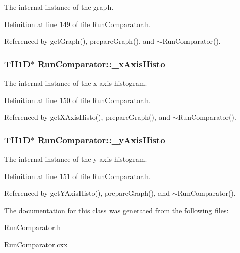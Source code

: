 The internal instance of the graph. 



Definition at line 149 of file Run\-Comparator.\-h.



Referenced by get\-Graph(), prepare\-Graph(), and $\sim$\-Run\-Comparator().

\hypertarget{class_run_comparator_ab86d48424540d0f3f9abf52a2c11366b}{
\subsubsection[{\-\_\-x\-Axis\-Histo}]{\setlength{\rightskip}{0pt plus 5cm}T\-H1\-D$\ast$ Run\-Comparator\-::\-\_\-x\-Axis\-Histo\hspace{0.3cm}{\ttfamily [protected]}}}\label{class_run_comparator_ab86d48424540d0f3f9abf52a2c11366b}


The internal instance of the x axis histogram. 



Definition at line 150 of file Run\-Comparator.\-h.



Referenced by get\-X\-Axis\-Histo(), prepare\-Graph(), and $\sim$\-Run\-Comparator().

\hypertarget{class_run_comparator_a05efdd671ec49502c946eb813e84ed62}{
\subsubsection[{\-\_\-y\-Axis\-Histo}]{\setlength{\rightskip}{0pt plus 5cm}T\-H1\-D$\ast$ Run\-Comparator\-::\-\_\-y\-Axis\-Histo\hspace{0.3cm}{\ttfamily [protected]}}}\label{class_run_comparator_a05efdd671ec49502c946eb813e84ed62}


The internal instance of the y axis histogram. 



Definition at line 151 of file Run\-Comparator.\-h.



Referenced by get\-Y\-Axis\-Histo(), prepare\-Graph(), and $\sim$\-Run\-Comparator().



The documentation for this class was generated from the following files\-:\begin{DoxyCompactItemize}
\item 
\hyperlink{_run_comparator_8h}{Run\-Comparator.\-h}\item 
\hyperlink{_run_comparator_8cxx}{Run\-Comparator.\-cxx}\end{DoxyCompactItemize}
